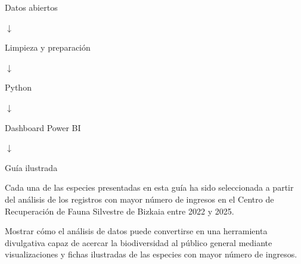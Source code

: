 \documentclass[11pt,a4paper]{article}
\begin{document}
\vspace{0.7cm}


\begin{tcolorbox}[
colback=Beige,
colframe=ForestGreen,
arc=4mm,
title=\textbf{\faProjectDiagram\ Del dato a la guía},
fonttitle=\bfseries]

\begin{center}

\Large

Datos abiertos

$\downarrow$

Limpieza y preparación

$\downarrow$

Python

$\downarrow$

Dashboard Power BI

$\downarrow$

Guía ilustrada

\end{center}

\end{tcolorbox}

\vspace{0.45cm}

\begin{center}

\small

Cada una de las especies presentadas en esta guía ha sido seleccionada a partir del análisis de los registros con mayor número de ingresos en el Centro de Recuperación de Fauna Silvestre de Bizkaia entre 2022 y 2025.

\end{center}

\vspace{0.35cm}


\begin{tcolorbox}[
colback=Stone,
colframe=SoftGreen,
arc=3mm,
title=\textbf{\faLightbulb\ Objetivo del proyecto},
fonttitle=\bfseries]

Mostrar cómo el análisis de datos puede convertirse en una herramienta divulgativa capaz de acercar la biodiversidad al público general mediante visualizaciones y fichas ilustradas de las especies con mayor número de ingresos.

\end{tcolorbox}
\end{document}
